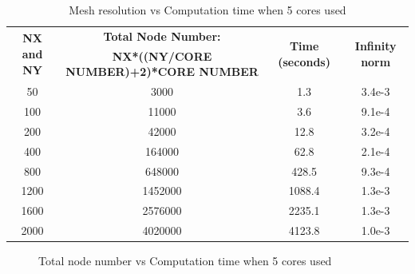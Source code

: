 \documentclass{article}
\begin{document}
\begin{table}[h]
    \centering
    \begin{tabular}{|c|c|c|c|}
        \hline
        \multirow{2}{*}{\textbf{NX and NY}} & \textbf{Total Node Number: }  & \multirow{2}{*}{\textbf{Time (seconds)}} &  \multirow{2}{*}{\textbf{Infinity norm}} \\
        &\textbf{NX*((NY/CORE NUMBER)+2)*CORE NUMBER} & & \\
        \hline
        50    & 3000 &1.3 & 3.4e-3   \\
        100   & 11000 &3.6 & 9.1e-4 \\
        200   & 42000 &12.8 & 3.2e-4 \\
        400   & 164000 &62.8 & 2.1e-4 \\
        800   & 648000 &428.5 & 9.3e-4 \\
        1200  & 1452000 &1088.4 & 1.3e-3 \\
        1600  & 2576000 &2235.1 & 1.3e-3 \\
        2000  & 4020000 &4123.8 & 1.0e-3 \\
        \hline
    \end{tabular}
    \caption{Mesh resolution vs Computation time when 5 cores used}
    \label{tab:veritablo}
\end{table}
  
\begin{figure}[hbt!]
  \centering
  \caption{Total node number vs Computation time when 5 cores used}
  \label{t3}
\end{figure}



\clearpage
\end{document}
